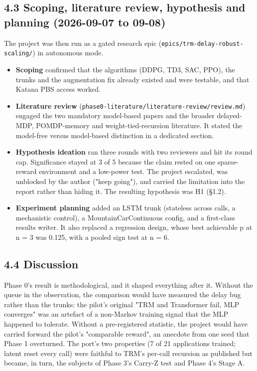 \documentclass[11pt]{article}
\begin{document}
\subsection*{4.3 Scoping, literature review, hypothesis and planning (2026-09-07 to 09-08)}



The project was then run as a gated research epic (\texttt{epics/\allowbreak{}trm-delay-robust-scaling/\allowbreak{}}) in autonomous mode.



\begin{itemize}
\item \textbf{Scoping} confirmed that the algorithms (DDPG, TD3, SAC, PPO), the trunks and the augmentation fix already existed and were testable, and that Katana PBS access worked.
\item \textbf{Literature review} (\texttt{phase0-literature/\allowbreak{}literature-review/\allowbreak{}review.\allowbreak{}md}) engaged the two mandatory model-based papers and the broader delayed-MDP, POMDP-memory and weight-tied-recursion literature. It stated the model-free versus model-based distinction in a dedicated section.
\item \textbf{Hypothesis ideation} ran three rounds with two reviewers and hit its round cap. Significance stayed at 3 of 5 because the claim rested on one sparse-reward environment and a low-power test. The project escalated, was unblocked by the author ("keep going"), and carried the limitation into the report rather than hiding it. The resulting hypothesis was H1 (\S{}1.2).
\item \textbf{Experiment planning} added an LSTM trunk (stateless across calls, a mechanistic control), a MountainCarContinuous config, and a first-class results writer. It also replaced a regression design, whose best achievable p at n = 3 was 0.125, with a pooled sign test at n = 6.
\end{itemize}



\subsection*{4.4 Discussion}



Phase 0's result is methodological, and it shaped everything after it. Without the queue in the observation, the comparison would have measured the delay bug rather than the trunks: the pilot's original "TRM and Transformer fail, MLP converges" was an artefact of a non-Markov training signal that the MLP happened to tolerate. Without a pre-registered statistic, the project would have carried forward the pilot's "comparable reward", an anecdote from one seed that Phase 1 overturned. The port's two properties (7 of 21 applications trained; latent reset every call) were faithful to TRM's per-call recursion as published but became, in turn, the subjects of Phase 3's Carry-Z test and Phase 4's Stage A.
\end{document}
